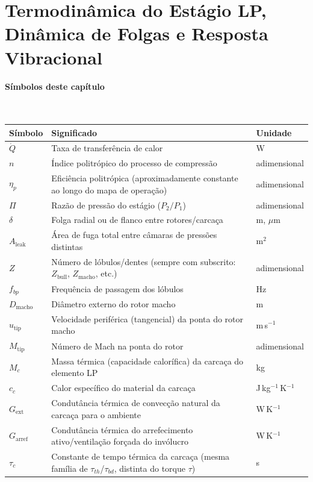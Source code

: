 \documentclass[12pt,a4paper]{article}
\numberwithin{equation}{section}
\numberwithin{table}{section}
\numberwithin{figure}{section}
\begin{document}
	
	
	\clearpage
	\section{\textbf{Termodinâmica do Estágio LP, Dinâmica de Folgas e Resposta Vibracional}}




\paragraph{Símbolos deste capítulo}\mbox{}\\[-0.5em]
{\small
\begin{longtable}{>{\raggedright\arraybackslash}p{2.6cm} >{\raggedright\arraybackslash}p{9.2cm} >{\raggedright\arraybackslash}p{2.6cm}}
	\toprule
	\textbf{Símbolo} & \textbf{Significado} & \textbf{Unidade} \\ \midrule
	\endhead
	$\dot{Q}$ & Taxa de transferência de calor & W \\
	$n$ & Índice politrópico do processo de compressão & adimensional \\
	$\eta_p$ & Eficiência politrópica (aproximadamente constante ao longo do mapa de operação) & adimensional \\
	$\Pi$ & Razão de pressão do estágio ($P_2/P_1$) & adimensional \\
	$\delta$ & Folga radial ou de flanco entre rotores/carcaça & m, $\mu$m \\
	$A_{\text{leak}}$ & Área de fuga total entre câmaras de pressões distintas & m$^2$ \\
	$Z$ & Número de lóbulos/dentes (sempre com subscrito: $Z_{\text{bull}}$, $Z_{\text{macho}}$, etc.) & adimensional \\
	$f_{bp}$ & Frequência de passagem dos lóbulos & Hz \\
	$D_{\text{macho}}$ & Diâmetro externo do rotor macho & m \\
	$u_{\text{tip}}$ & Velocidade periférica (tangencial) da ponta do rotor macho & m\,s$^{-1}$ \\
	$M_{\text{tip}}$ & Número de Mach na ponta do rotor & adimensional \\
	$M_c$ & Massa térmica (capacidade calorífica) da carcaça do elemento LP & kg \\
	$c_c$ & Calor específico do material da carcaça & J\,kg$^{-1}$\,K$^{-1}$ \\
	$G_{\text{ext}}$\dag & Condutância térmica de convecção natural da carcaça para o ambiente & W\,K$^{-1}$ \\
	$G_{\text{arref}}$\dag & Condutância térmica do arrefecimento ativo/ventilação forçada do invólucro & W\,K$^{-1}$ \\
	$\tau_c$\dag & Constante de tempo térmica da carcaça (mesma família de $\tau_{th}$/$\tau_{bd}$, distinta do torque $\tau$) & s \\
	\bottomrule
\end{longtable}
}
\end{document}
